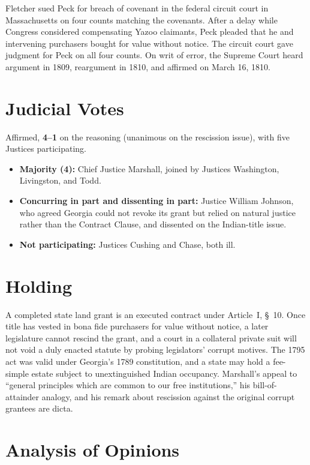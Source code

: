\documentclass[12pt]{article}
\begin{document}
Fletcher sued Peck for breach of covenant in the federal circuit court in Massachusetts on four counts matching the covenants. After a delay while Congress considered compensating Yazoo claimants, Peck pleaded that he and intervening purchasers bought for value without notice. The circuit court gave judgment for Peck on all four counts. On writ of error, the Supreme Court heard argument in 1809, reargument in 1810, and affirmed on March 16, 1810.

\section{Judicial Votes}

Affirmed, \textbf{4--1} on the reasoning (unanimous on the rescission issue), with five Justices participating.
\begin{itemize}
\item \textbf{Majority (4):} Chief Justice Marshall, joined by Justices Washington, Livingston, and Todd.
\item \textbf{Concurring in part and dissenting in part:} Justice William Johnson, who agreed Georgia could not revoke its grant but relied on natural justice rather than the Contract Clause, and dissented on the Indian-title issue.
\item \textbf{Not participating:} Justices Cushing and Chase, both ill.
\end{itemize}

\section{Holding}

A completed state land grant is an executed contract under Article~I, \S~10. Once title has vested in bona fide purchasers for value without notice, a later legislature cannot rescind the grant, and a court in a collateral private suit will not void a duly enacted statute by probing legislators' corrupt motives. The 1795 act was valid under Georgia's 1789 constitution, and a state may hold a fee-simple estate subject to unextinguished Indian occupancy. Marshall's appeal to ``general principles which are common to our free institutions,'' his bill-of-attainder analogy, and his remark about rescission against the original corrupt grantees are dicta.

\section{Analysis of Opinions}
\end{document}
